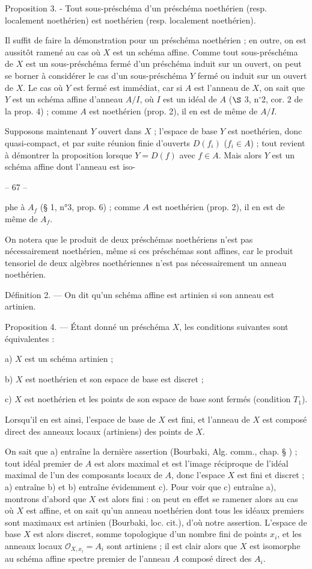 Proposition 3. - Tout sous-préschéma d'un préschéma noethérien (resp. localement noethérien) est noethérien (resp. localement noethérien).

Il suffit de faire la démonstration pour un préschéma noethérien ; en outre, on est aussitôt ramené au cas où $X$ est un schéma affine. Comme tout sous-préschéma de $X$ est un sous-préschéma fermé d'un préschéma induit sur un ouvert, on peut se borner à considérer le cas d'un sous-préschéma $Y$ fermé ou induit sur un ouvert de $X$. Le cas où $Y$ est fermé est immédiat, car si $A$ est l'anneau de $X$, on sait que $Y$ est un schéma affine d'anneau $A/I$, où $I$ est un idéal de $A$ ($\S$ 3, n$^\circ$2, cor. 2 de la prop. 4) ; comme $A$ est noethérien (prop. 2), il en est de même de $A/I$.

Supposons maintenant $Y$ ouvert dans $X$ ; l'espace de base $Y$ est noethérien, donc quasi-compact, et par suite réunion finie d'ouverts $D(f_i)$ ($f_i \in A$) ; tout revient à démontrer la proposition lorsque $Y = D(f)$ avec $f \in A$. Mais alors $Y$ est un schéma affine dont l'anneau est iso-

\newpage


-- 67 --

phe à $A_f$ (§ 1, n°3, prop. 6) ; comme $A$ est noethérien (prop. 2), il en est de même de $A_f$.

On notera que le produit de deux préschémas noethériens n'est pas nécessairement noethérien, même si ces préschémas sont affines, car le produit tensoriel de deux algèbres noethériennes n'est pas nécessairement un anneau noethérien.

Définition 2. — On dit qu'un schéma affine est artinien si son anneau est artinien.

Proposition 4. — Étant donné un préschéma $X$, les conditions suivantes sont équivalentes :

a) $X$ est un schéma artinien ;

b) $X$ est noethérien et son espace de base est discret ;

c) $X$ est noethérien et les points de son espace de base sont fermés (condition $T_1$).

Lorsqu'il en est ainsi, l'espace de base de $X$ est fini, et l'anneau de $X$ est composé direct des anneaux locaux (artiniens) des points de $X$.

On sait que a) entraîne la dernière assertion (Bourbaki, Alg. comm., chap. § ) ; tout idéal premier de $A$ est alors maximal et est l'image réciproque de l'idéal maximal de l'un des composants locaux de $A$, donc l'espace $X$ est fini et discret ; a) entraîne b) et b) entraîne évidemment c). Pour voir que c) entraîne a), montrons d'abord que $X$ est alors fini : on peut en effet se ramener alors au cas où $X$ est affine, et on sait qu'un anneau noethérien dont tous les idéaux premiers sont maximaux est artinien (Bourbaki, loc. cit.), d'où notre assertion. L'espace de base $X$ est alors discret, somme topologique d'un nombre fini de points $x_i$, et les anneaux locaux $\mathcal{O}_{X,x_i} = A_i$ sont artiniens ; il est clair alors que $X$ est isomorphe au schéma affine spectre premier de l'anneau $A$ composé direct des $A_i$.

